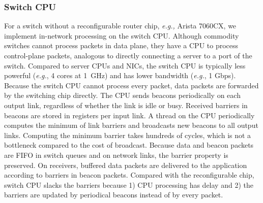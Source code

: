 
\subsubsection{Switch CPU}
\label{sec:commodity}

For a switch without a reconfigurable router chip, \textit{e.g.,} Arista 7060CX, we implement in-network processing on the switch CPU.
Although commodity switches cannot process packets in data plane, they have a CPU to process control-plane packets, analogous to directly connecting a server to a port of the switch.
Compared to server CPUs and NICs, the switch CPU is typically less powerful (\textit{e.g.}, 4 cores at 1~GHz) and has lower bandwidth (\textit{e.g.}, 1 Gbps).
Because the switch CPU cannot process every packet, data packets are forwarded by the switching chip directly. %
The CPU sends beacons periodically on each output link, regardless of whether the link is idle or busy.
Received barriers in beacons are stored in registers per input link.
A thread on the CPU periodically computes the minimum of link barriers and broadcasts new beacons to all output links.
Computing the minimum barrier takes hundreds of cycles, which is not a bottleneck compared to the cost of broadcast.
Because data and beacon packets are FIFO in switch queues and on network links, the barrier property is preserved. On receivers, buffered data packets are delivered to the application according to barriers in beacon packets.
Compared with the reconfigurable chip, switch CPU slacks the barriers because 1) CPU processing has delay and 2) the barriers are updated by periodical beacons instead of by every packet.

